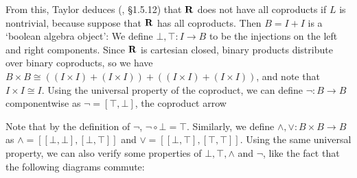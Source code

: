 From this, Taylor deduces (\cite{taylor}, \S 1.5.12) that $ \mathbf{R} $ does not have all coproducts if $ L $ is nontrivial, because suppose that $ \mathbf{R} $ has all coproducts. Then $ B = I + I $ is a `boolean algebra object': We define $ \bot, \top: I \to B $ to be the injections on the left and right components. Since $ \mathbf{R} $ is cartesian closed, binary products distribute over binary coproducts, so we have $ B \times B \cong ((I \times I) + (I \times I)) + ((I \times I) + (I \times I)) $, and note that $ I \times I \cong I $. Using the universal property of the coproduct, we can define $ \lnot: B \to B $ componentwise as $ \lnot = [\top, \bot] $, the coproduct arrow
\begin{center}
\end{center}
Note that by the definition of $ \lnot $, $ \lnot \circ \bot = \top $. Similarly, we define $ \land, \lor : B \times B \to B $ as $ \land = [[\bot, \bot], [\bot, \top]] $ and $ \lor = [[\bot, \top], [\top, \top]] $. Using the same universal property, we can also verify some properties of $ \bot, \top, \land $ and $ \lnot $, like the fact that the following diagrams commute:
\begin{center}
\end{center}
